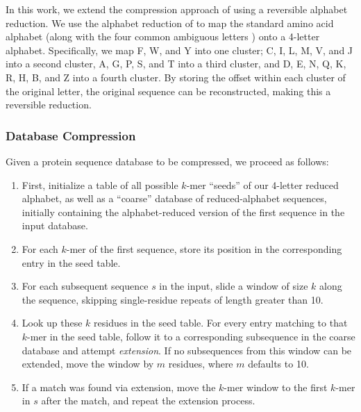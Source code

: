 \documentclass[review,preprint,12pt]{elsarticle}
\theoremstyle{definition}
\theoremstyle{remark}
\numberwithin{equation}{section}
\begin{document}
In this work, we extend the compression approach of \citet{Daniels:2013} using
a reversible alphabet reduction.
We use the alphabet reduction of \citet{Murphy:2000} to map the standard amino
acid alphabet (along with the four common ambiguous letters ) onto a 4-letter 
alphabet.
Specifically, we map F, W, and Y into one cluster; C, I, L, M, V, and J into
a second cluster, A, G, P, S, and T into a third cluster, and
D, E, N, Q, K, R, H, B, and Z into a fourth cluster.
By storing the offset within each cluster of the original letter, the original
sequence can be reconstructed, making this a reversible reduction.

\subsubsection*{Database Compression}

Given a protein sequence database to be compressed, we proceed as follows:
\begin{enumerate}
        \item First, initialize a table of all possible $k$-mer ``seeds'' of
        our 4-letter reduced alphabet, as well as a ``coarse'' database of
        reduced-alphabet sequences, initially containing the alphabet-reduced
        version of the first sequence in the input database.
        \item For each $k$-mer of the first sequence, store its position in the
        corresponding entry in the seed table.
        \item For each subsequent sequence $s$ in the input, slide a window of 
        size $k$ along the sequence, skipping single-residue repeats of length
        greater than 10.
        \item Look up these $k$ residues in the seed table.
        For every entry matching to that $k$-mer in the seed table, follow
        it to a corresponding subsequence in the coarse database and attempt
        \textit{extension}.
        If no subsequences from this window can be extended, move the window
        by $m$ residues, where $m$ defaults to 10.
        \item If a match was found via extension, move the $k$-mer window to
        the first $k$-mer in $s$ after the match, and repeat the extension
        process.
\end{enumerate}
        
\end{document}
